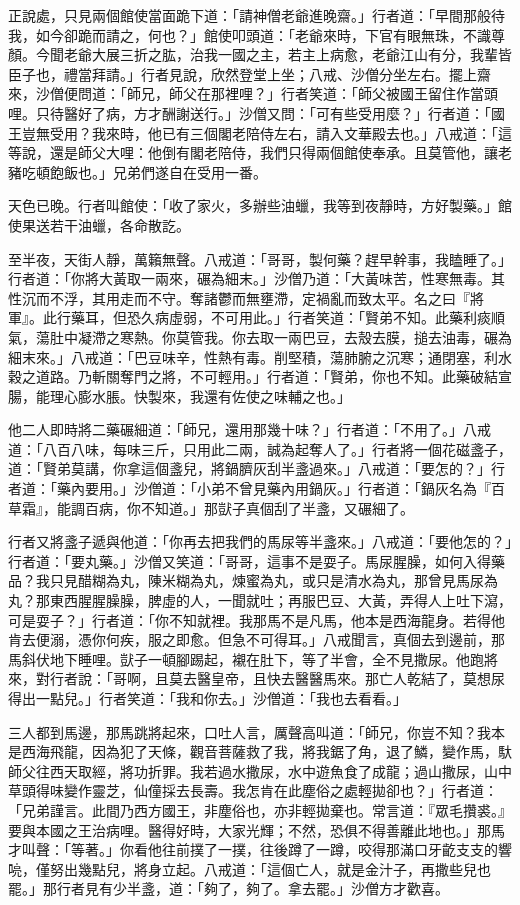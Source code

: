 正說處，只見兩個館使當面跪下道：「請神僧老爺進晚齋。」行者道：「早間那般待我，如今卻跪而請之，何也？」館使叩頭道：「老爺來時，下官有眼無珠，不識尊顏。今聞老爺大展三折之肱，治我一國之主，若主上病愈，老爺江山有分，我輩皆臣子也，禮當拜請。」行者見說，欣然登堂上坐；八戒、沙僧分坐左右。擺上齋來，沙僧便問道：「師兄，師父在那裡哩？」行者笑道：「師父被國王留住作當頭哩。只待醫好了病，方才酬謝送行。」沙僧又問：「可有些受用麼？」行者道：「國王豈無受用？我來時，他已有三個閣老陪侍左右，請入文華殿去也。」八戒道：「這等說，還是師父大哩：他倒有閣老陪侍，我們只得兩個館使奉承。且莫管他，讓老豬吃頓飽飯也。」兄弟們遂自在受用一番。

天色已晚。行者叫館使：「收了家火，多辦些油蠟，我等到夜靜時，方好製藥。」館使果送若干油蠟，各命散訖。

至半夜，天街人靜，萬籟無聲。八戒道：「哥哥，製何藥？趕早幹事，我瞌睡了。」行者道：「你將大黃取一兩來，碾為細末。」沙僧乃道：「大黃味苦，性寒無毒。其性沉而不浮，其用走而不守。奪諸鬱而無壅滯，定禍亂而致太平。名之曰『將軍』。此行藥耳，但恐久病虛弱，不可用此。」行者笑道：「賢弟不知。此藥利痰順氣，蕩肚中凝滯之寒熱。你莫管我。你去取一兩巴豆，去殼去膜，搥去油毒，碾為細末來。」八戒道：「巴豆味辛，性熱有毒。削堅積，蕩肺腑之沉寒；通閉塞，利水穀之道路。乃斬關奪門之將，不可輕用。」行者道：「賢弟，你也不知。此藥破結宣腸，能理心膨水脹。快製來，我還有佐使之味輔之也。」

他二人即時將二藥碾細道：「師兄，還用那幾十味？」行者道：「不用了。」八戒道：「八百八味，每味三斤，只用此二兩，誠為起奪人了。」行者將一個花磁盞子，道：「賢弟莫講，你拿這個盞兒，將鍋臍灰刮半盞過來。」八戒道：「要怎的？」行者道：「藥內要用。」沙僧道：「小弟不曾見藥內用鍋灰。」行者道：「鍋灰名為『百草霜』，能調百病，你不知道。」那獃子真個刮了半盞，又碾細了。

行者又將盞子遞與他道：「你再去把我們的馬尿等半盞來。」八戒道：「要他怎的？」行者道：「要丸藥。」沙僧又笑道：「哥哥，這事不是耍子。馬尿腥臊，如何入得藥品？我只見醋糊為丸，陳米糊為丸，煉蜜為丸，或只是清水為丸，那曾見馬尿為丸？那東西腥腥臊臊，脾虛的人，一聞就吐；再服巴豆、大黃，弄得人上吐下瀉，可是耍子？」行者道：「你不知就裡。我那馬不是凡馬，他本是西海龍身。若得他肯去便溺，憑你何疾，服之即愈。但急不可得耳。」八戒聞言，真個去到邊前，那馬斜伏地下睡哩。獃子一頓腳踢起，襯在肚下，等了半會，全不見撒尿。他跑將來，對行者說：「哥啊，且莫去醫皇帝，且快去醫醫馬來。那亡人乾結了，莫想尿得出一點兒。」行者笑道：「我和你去。」沙僧道：「我也去看看。」

三人都到馬邊，那馬跳將起來，口吐人言，厲聲高叫道：「師兄，你豈不知？我本是西海飛龍，因為犯了天條，觀音菩薩救了我，將我鋸了角，退了鱗，變作馬，馱師父往西天取經，將功折罪。我若過水撒尿，水中遊魚食了成龍；過山撒尿，山中草頭得味變作靈芝，仙僮採去長壽。我怎肯在此塵俗之處輕拋卻也？」行者道：「兄弟謹言。此間乃西方國王，非塵俗也，亦非輕拋棄也。常言道：『眾毛攢裘。』要與本國之王治病哩。醫得好時，大家光輝；不然，恐俱不得善離此地也。」那馬才叫聲：「等著。」你看他往前撲了一撲，往後蹲了一蹲，咬得那滿口牙齕支支的響喨，僅努出幾點兒，將身立起。八戒道：「這個亡人，就是金汁子，再撒些兒也罷。」那行者見有少半盞，道：「夠了，夠了。拿去罷。」沙僧方才歡喜。

